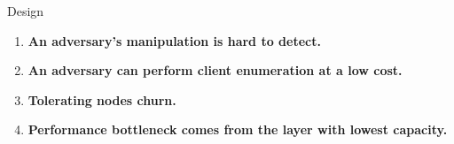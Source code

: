 \documentclass[final]{beamer}
\newlength{\maincolwidth}
\begin{document}
\begin{frame}[t]
\begin{columns}[t]
\begin{column}{\maincolwidth}
%
%    

  \begin{alertblock}{Design}
  \begin{enumerate}
    \item \textbf{An adversary's manipulation is hard to detect.}
    \item \textbf{An adversary can perform client enumeration at a low cost.}
    \item \textbf{Tolerating nodes churn.}
    \item \textbf{Performance bottleneck comes from the layer with lowest capacity.}
  \end{enumerate}
      

\end{alertblock}
\end{column}
\end{columns}
\end{frame}
\end{document}
